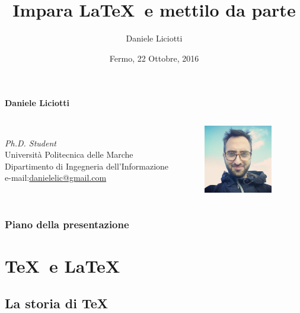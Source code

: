 \documentclass[10pt,svgnames,%
ucs,%
pdftex]{mybeamer}
\title{Impara \LaTeX~e mettilo da parte}
\subtitle{}
\author{Daniele Liciotti}
\institute{ICT Engineer and PhD Student}
\date{Fermo, 22 Ottobre, 2016}
\begin{document}
\maketitle
\begin{frame}
	\begin{block}{\textbf{Daniele Liciotti}}
		\begin{columns}
			\vspace{1cm}\\
			\emph{Ph.D. Student}\\
			Università Politecnica delle Marche\\
			Dipartimento di Ingegneria dell'Informazione\\
			
			\vspace{1cm}
			e-mail:\qquad \url{danielelic@gmail.com}
			\begin{figure}
				\centering
				\includegraphics[height=3cm]{img/me}
			\end{figure}
		\end{columns}
	\end{block}
\end{frame}

\begin{frame}
	\frametitle{Piano della presentazione}
	\tableofcontents
\end{frame}
\section{\TeX\ e \LaTeX}
\subsection{La storia di \TeX}
\end{document}
